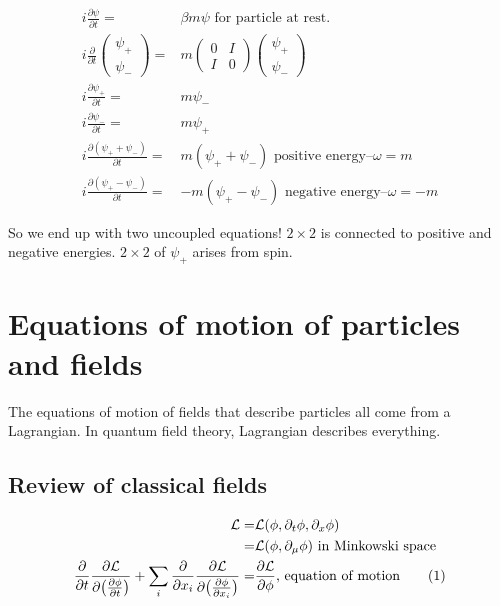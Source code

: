 \documentclass[]{article}
\newcommand\numberthis{\addtocounter{equation}{1}\tag{\theequation}}
\begin{document}
\begin{align*}
i \frac{\partial \psi}{\partial t} =&  \beta m \psi \text{ for particle at rest.}\\
i \frac{\partial}{\partial t}\begin{pmatrix}
\psi_+\\
\psi_-
\end{pmatrix}=&m \begin{pmatrix}
0&I\\
I&0
\end{pmatrix}\begin{pmatrix}
\psi_+\\
\psi_-
\end{pmatrix}\\
i \frac{\partial \psi_+}{\partial t} =&   m \psi_-\\
i \frac{\partial \psi_-}{\partial t} =&   m \psi_+ \\
i \frac{\partial (\psi_++\psi_-)}{\partial t} =&   m (\psi_++\psi_-) \text{ positive energy--$\omega=m$}\\
i \frac{\partial (\psi_+-\psi_-)}{\partial t} =&   -m (\psi_+-\psi_-) \text{ negative energy--$\omega=-m$}
\end{align*}

So we end up with two uncoupled equations! $2\times2$ is connected to positive and negative energies. $2\times2$ of $\psi_+$ arises from spin.


\section{Equations of motion of particles and fields}\label{sect:equation:motion}

The equations of motion of fields that describe  particles all come from a Lagrangian. In quantum field theory, Lagrangian describes everything.

\subsection{Review of classical fields}

\begin{align*}
\mathcal{L}=& \mathcal{L}(\phi,\partial_t \phi, \partial_x \phi)\\
=&\mathcal{L}(\phi,\partial_{\mu} \phi) \text{ in Minkowski space}\\
\frac{\partial}{\partial t} \frac{\partial \mathcal{L}}{\partial \big(\frac{\partial \phi}{\partial t}\big)}+\sum_i \frac{\partial}{\partial x_i} \frac{\partial \mathcal{L}}{\partial \big(\frac{\partial \phi}{\partial x_i}\big)}=&\frac{\partial \mathcal{L}}{\partial \phi} \text{, equation of motion} \numberthis \label{eq:lagrange}
\end{align*}
\end{document}
